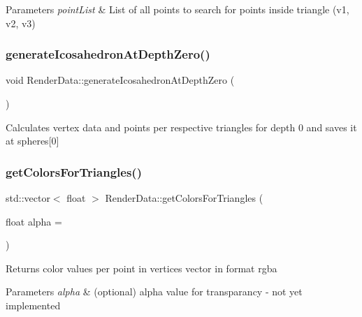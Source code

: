 \begin{DoxyParams}{Parameters}
{\em point\+List} & List of all points to search for points \textquotesingle{}inside\textquotesingle{} triangle (v1, v2, v3) \\
\hline
\end{DoxyParams}
\mbox{\label{class_render_data_adee024bdbedaae2cfd38bb2038b4aa48}} 
\subsubsection{\texorpdfstring{generate\+Icosahedron\+At\+Depth\+Zero()}{generateIcosahedronAtDepthZero()}}
{\footnotesize\ttfamily void Render\+Data\+::generate\+Icosahedron\+At\+Depth\+Zero (\begin{DoxyParamCaption}{ }\end{DoxyParamCaption})\hspace{0.3cm}{\ttfamily [private]}}

Calculates vertex data and points per respective triangles for depth 0 and saves it at spheres\mbox{[}0\mbox{]} \mbox{\label{class_render_data_a58fe3351334cd518b930dfe0a0aa8732}} 
\subsubsection{\texorpdfstring{get\+Colors\+For\+Triangles()}{getColorsForTriangles()}}
{\footnotesize\ttfamily std\+::vector$<$ float $>$ Render\+Data\+::get\+Colors\+For\+Triangles (\begin{DoxyParamCaption}\item[{float}]{alpha = {} }\end{DoxyParamCaption})}

\begin{DoxyReturn}{Returns}
color values per point in vertices vector in format rgba 
\end{DoxyReturn}

\begin{DoxyParams}{Parameters}
{\em alpha} & (optional) alpha value for transparancy -\/ not yet implemented \\
\hline
\end{DoxyParams}
\mbox{\label{class_render_data_a1fffc72f3dd17ab052d4fb2f025ef5a0}} 
